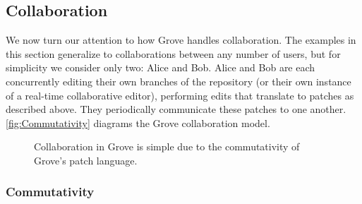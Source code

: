 \subsection{Collaboration}%
\label{sub:Multi-user Interactions}

We now turn our attention to how Grove handles collaboration.
The examples in this section generalize to collaborations between any number of users,
but for simplicity we consider only two: Alice and Bob.
Alice and Bob are each concurrently editing their own branches of the repository (or their own instance of a real-time collaborative editor), 
performing edits that translate to patches as described above. 
They periodically communicate these patches to one another. \autoref{fig:Commutativity} diagrams the Grove collaboration model.



\begin{figure}[h]
  \centering
  \caption{Collaboration in Grove is simple due to the commutativity of Grove's patch language.}
  \label{fig:Commutativity}
\end{figure}



\subsubsection{Commutativity}%
\figureDifferentPartsNestedParts

